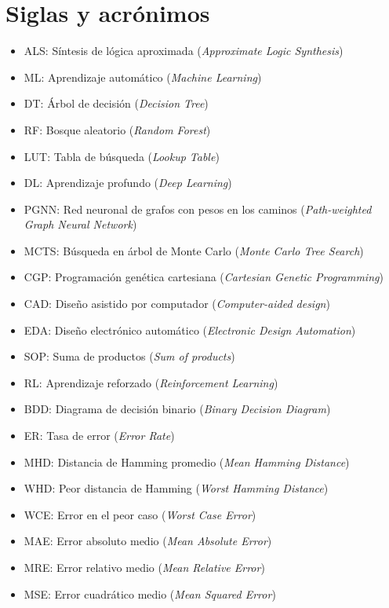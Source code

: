 \chapter*{Siglas y acrónimos}

\begin{itemize}
  \item ALS: Síntesis de lógica aproximada (\emph{Approximate Logic Synthesis})
  \item ML: Aprendizaje automático (\emph{Machine Learning})
  \item DT: Árbol de decisión (\emph{Decision Tree})
  \item RF: Bosque aleatorio (\emph{Random Forest})
  \item LUT: Tabla de búsqueda (\emph{Lookup Table})
  \item DL: Aprendizaje profundo (\emph{Deep Learning})
  \item PGNN: Red neuronal de grafos con pesos en los caminos (\emph{Path-weighted Graph Neural Network})
  \item MCTS: Búsqueda en árbol de Monte Carlo (\emph{Monte Carlo Tree Search})
  \item CGP: Programación genética cartesiana (\emph{Cartesian Genetic Programming})
  \item CAD: Diseño asistido por computador (\emph{Computer-aided design})
  \item EDA: Diseño electrónico automático (\emph{Electronic Design Automation})
  \item SOP: Suma de productos (\emph{Sum of products})
  \item RL: Aprendizaje reforzado (\emph{Reinforcement Learning})
  \item BDD: Diagrama de decisión binario (\emph{Binary Decision Diagram})
  \item ER: Tasa de error (\emph{Error Rate})
  \item MHD: Distancia de Hamming promedio (\emph{Mean Hamming Distance})
  \item WHD: Peor distancia de Hamming (\emph{Worst Hamming Distance})
  \item WCE: Error en el peor caso (\emph{Worst Case Error})
  \item MAE: Error absoluto medio (\emph{Mean Absolute Error})
  \item MRE: Error relativo medio (\emph{Mean Relative Error})
  \item MSE: Error cuadrático medio (\emph{Mean Squared Error})
\end{itemize}
